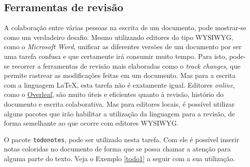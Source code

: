 \subsection{Ferramentas de revisão}
\label{sec:ferrev}

A colaboração entre várias pessoas na escrita de um documento, pode mostrar-se como um verdadeiro desafio. Mesmo utilizando editores do tipo WYSIWYG, como o \textit{Microsoft Word}, unificar as diferentes versões de um documento por ser uma tarefa confusa e que certamente irá consumir muito tempo. Para isto, pode-se recorrer a ferramentas de revisão mais elaboradas como o \textit{track changes}, que permite rastrear as modificações feitas em um documento. Mas para a escrita com a linguagem \LaTeX{}, esta tarefa não é exatamente igual. Editores \textit{online}, como o \href{https://www.overleaf.com/}{Overleaf}, são muito úteis e eficientes quanto à revisão, histório do documento e escrita colaborativa. Mas para editores locais, é possível utilizar alguns pacotes que irão habilitar a utilização da linguagem para a revisão, de forma semelhante ao que ocorre com editores WYSIWYG.

O pacote {\tt todonotes}, pode ser utilizado nesta tarefa. Com ele é possível inserir notas coloridas no documento de forma que se possa chamar a atenção para alguma parte do texto. Veja o Exemplo \ref{todo1} a seguir com a sua utilização.

%
%
%
%
%
%
%
%
%
%

